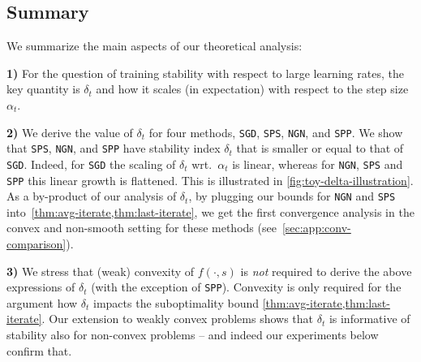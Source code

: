 \documentclass{article}
\newcommand{\SGD}{{\texttt{SGD}}}
\newcommand{\SPP}{{\texttt{SPP}}}
\newcommand{\SPS}{{\texttt{SPS}}}
\newcommand{\NGN}{{\texttt{NGN}}}
\theoremstyle{plain}
\theoremstyle{definition}
\theoremstyle{remark}
\begin{document}
\subsection{Summary}
%
We summarize the main aspects of our theoretical analysis:

\hspace{2ex}\textbf{1)} For the question of training stability with respect to large learning rates, the key quantity is $\delta_t$ and how it scales (in expectation) with respect to the step size $\alpha_t$.

\hspace{2ex}\textbf{2)} We derive the value of $\delta_t$ for four methods, \SGD{}, \SPS{}, \NGN{}, and \SPP{}. We show that \SPS{}, \NGN{}, and \SPP{} have stability index $\delta_t$ that is smaller or equal to that of \SGD{}.  Indeed, for \SGD{} the scaling of $\delta_t$ wrt.\ $\alpha_t$ is linear, whereas for \NGN{}, \SPS{} and \SPP{} this linear growth is flattened. This is illustrated in \cref{fig:toy-delta-illustration}.  As a by-product of our analysis of $\delta_t$, by plugging our bounds for  \NGN{} and \SPS{} into~\cref{thm:avg-iterate,thm:last-iterate}, we get the first convergence analysis in the convex and non-smooth setting for these methods (see~\cref{sec:app:conv-comparison}). 

\hspace{2ex}\textbf{3)} We stress that (weak) convexity of $f(\cdot,s)$ is \emph{not} required to derive the above expressions of $\delta_t$ (with the exception of \SPP{}). Convexity is only required for the argument how $\delta_t$ impacts the suboptimality bound \cref{thm:avg-iterate,thm:last-iterate}. Our extension to weakly convex problems shows that $\delta_t$ is informative of stability also for non-convex problems -- and indeed our experiments below confirm that.
\end{document}

